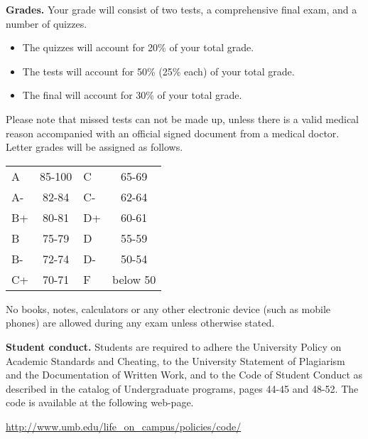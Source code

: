 \documentclass{article}
\begin{document}


\medskip
\noindent \textbf{Grades.} Your grade will consist of two tests, a comprehensive final exam, and a number of quizzes. 
\begin{itemize}
\item The quizzes will account for 20\% of your total grade.
\item The tests will account for 50\% (25\% each) of your total grade.
\item The final will account for 30\% of your total grade.
\end{itemize}
Please note that missed tests can not be made up, unless there is a valid medical reason accompanied with an official signed document from a medical doctor. Letter grades will be assigned as follows. 

\begin{center}
\begin{tabular}{lc|lc}
A & 85-100 & C & 65-69 \\
A-& 82-84 & C- & 62-64 \\
B+& 80-81 & D+ & 60-61 \\
B & 75-79& D & 55-59\\
B-& 72-74& D- & 50-54\\
C+& 70-71& F & below 50\\
\end{tabular}

\end{center}

No books, notes, calculators or any other electronic device (such as mobile phones) are allowed during any exam unless otherwise stated.

\medskip
\noindent \textbf{Student conduct.} Students  are required to adhere the University Policy on Academic Standards and Cheating, to the University Statement of Plagiarism and the Documentation of Written Work, and to the Code of Student Conduct as described in the catalog of Undergraduate programs, pages 44-45 and 48-52. The code is available at the following web-page.

\noindent\url{http://www.umb.edu/life_on_campus/policies/code/}
\end{document}
